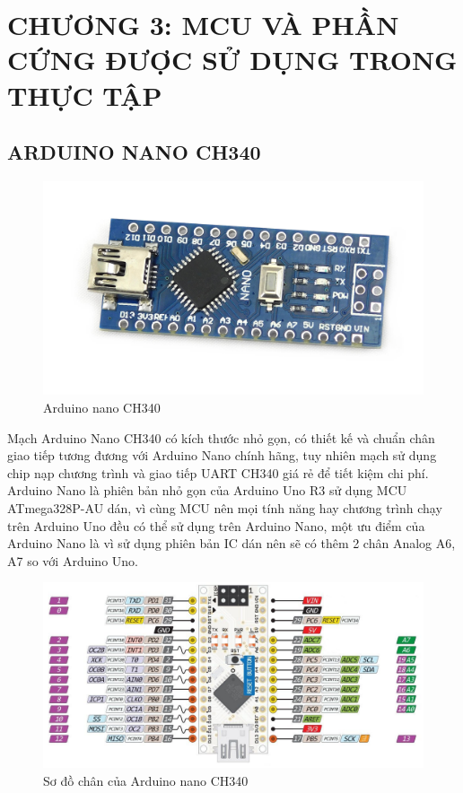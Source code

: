 \section*{CHƯƠNG 3: MCU VÀ PHẦN CỨNG ĐƯỢC SỬ DỤNG TRONG THỰC TẬP}
\setcounter{section}{3}
\setcounter{subsection}{0}
\subsection{ARDUINO NANO CH340}
\begin{figure}[H]
	\centering
	\includegraphics[scale=0.15]{Chapter 3/image chapter 3/nano.jpg}
	\caption[Arduino nano CH340]{Arduino nano CH340}
	\label{hinh31}
\end{figure}
Mạch Arduino Nano CH340 có kích thước nhỏ gọn, có thiết kế và chuẩn chân giao tiếp tương đương với Arduino Nano chính hãng, tuy nhiên mạch sử dụng chip nạp chương trình và giao tiếp UART CH340 giá rẻ để tiết kiệm chi phí.\\
\indent Arduino Nano là phiên bản nhỏ gọn của Arduino Uno R3 sử dụng MCU ATmega328P-AU dán, vì cùng MCU nên mọi tính năng hay chương trình chạy trên Arduino Uno đều có thể sử dụng trên Arduino Nano, một ưu điểm của Arduino Nano là vì sử dụng phiên bản IC dán nên sẽ có thêm 2 chân Analog A6, A7 so với Arduino Uno.\\
\begin{figure}[H]
	\centering
	\includegraphics[scale=.7]{Chapter 3/image chapter 3/sodoNano.png}
	\caption[Sơ đồ chân của Arduino nano CH340]{Sơ đồ chân của Arduino nano CH340}
	\label{hinh32}
\end{figure}
